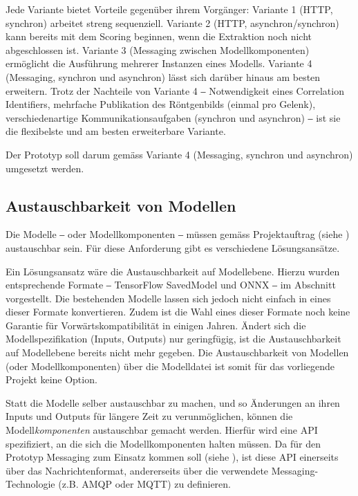 Jede Variante bietet Vorteile gegenüber ihrem Vorgänger: Variante 1 (HTTP, synchron) arbeitet streng sequenziell. Variante 2 (HTTP, asynchron/synchron) kann bereits mit dem Scoring beginnen, wenn die Extraktion noch nicht abgeschlossen ist. Variante 3 (Mes\-sag\-ing zwischen Modellkomponenten) ermöglicht die Ausführung mehrerer Instanzen eines Modells. Variante 4 (Messaging, synchron und asynchron) lässt sich darüber hinaus am besten erweitern. Trotz der Nachteile von Variante 4 ‒ Notwendigkeit eines Correlation Identifiers, mehrfache Publikation des Röntgenbilds (einmal pro Gelenk), verschiedenartige Kommunikationsaufgaben (synchron und asynchron) ‒ ist sie die flexibelste und am besten erweiterbare Variante.

Der Prototyp soll darum gemäss Variante 4 (Messaging, synchron und asynchron) umgesetzt werden.

\subsection{Austauschbarkeit von Modellen}
\label{sec:austauschbarkeit-von-modellen}

Die Modelle ‒ oder Modellkomponenten ‒ müssen gemäss Projektauftrag (siehe ) austauschbar sein. Für diese Anforderung gibt es verschiedene Lösungsansätze.

Ein Lösungsansatz wäre die Austauschbarkeit auf Modellebene. Hierzu wurden entsprechende Formate ‒ TensorFlow SavedModel und ONNX ‒ im Abschnitt  vorgestellt. Die bestehenden Modelle lassen sich jedoch nicht einfach in eines dieser Formate konvertieren. Zudem ist die Wahl eines dieser Formate noch keine Garantie für Vorwärtskompatibilität in einigen Jahren. Ändert sich die Modellspezifikation (Inputs, Outputs) nur geringfügig, ist die Austauschbarkeit auf Modellebene bereits nicht mehr gegeben. Die Austauschbarkeit von Modellen (oder Modellkomponenten) über die Modelldatei ist somit für das vorliegende Projekt keine Option.

Statt die Modelle selber austauschbar zu machen, und so Änderungen an ihren Inputs und Outputs für längere Zeit zu verunmöglichen, können die Modell\textit{komponenten} austauschbar gemacht werden. Hierfür wird eine API spezifiziert, an die sich die Modellkomponenten halten müssen. Da für den Prototyp Messaging zum Einsatz kommen soll (siehe ), ist diese API einerseits über das Nachrichtenformat, andererseits über die verwendete Messaging-Technologie (z.B. AMQP oder MQTT) zu definieren.

